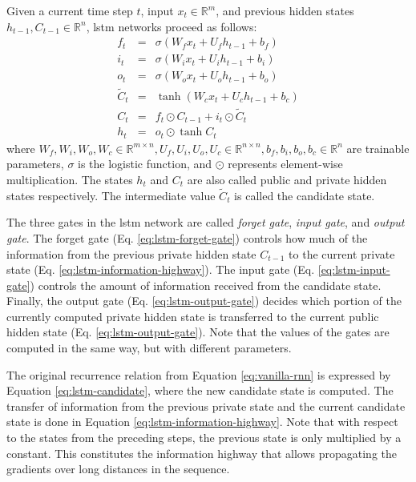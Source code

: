 Given a current time step $t$, input $x_t \in \mathbb{R}^m$, and previous hidden
states $h_{t-1}, C_{t-1} \in \mathbb{R}^n$, \gls{lstm} networks proceed as
follows:
%
\begin{eqnarray} f_t & = & \sigma\left(W_f x_t + U_f h_{t-1} + b_f\right)
\label{eq:lstm-forget-gate}\\ i_t & = & \sigma\left(W_i x_t + U_i h_{t-1} +
b_i\right)
\label{eq:lstm-input-gate}\\ o_t & = & \sigma\left(W_o x_t + U_o h_{t-1} +
b_o\right)
\label{eq:lstm-output-gate}\\ \tilde{C}_t & = & \tanh \left( W_c x_t + U_c
h_{t-1} + b_c \right)\label{eq:lstm-candidate} \\ C_t & = & f_t \odot C_{t-1} +
i_t \odot \tilde{C}_t
\label{eq:lstm-information-highway}\\ h_t & = & o_t \odot \tanh
C_t \label{eq:lstm-hidden-state}
\end{eqnarray}
%
where $W_f, W_i, W_o, W_c \in \mathbb{R}^{m \times n}, U_f, U_i, U_o, U_c \in
\mathbb{R}^{n \times n}, b_f, b_i, b_o, b_c \in \mathbb{R}^n$ are trainable
parameters, $\sigma$ is the logistic function, and $\odot$ represents
element-wise multiplication. The states $h_t$ and $C_t$ are also called public
and private hidden states respectively. The intermediate value $\tilde{C}_t$ is
called the candidate state.

The three gates in the \gls{lstm} network are called \emph{forget gate},
\emph{input gate}, and \emph{output gate}. The forget gate (Eq.
\ref{eq:lstm-forget-gate}) controls how much of the information from the
previous private hidden state $C_{t-1}$ to the current private state (Eq.
\ref{eq:lstm-information-highway}). The input gate (Eq.
\ref{eq:lstm-input-gate}) controls the amount of information received from the
candidate state. Finally, the output gate (Eq. \ref{eq:lstm-output-gate})
decides which portion of the currently computed private hidden state is
transferred to the current public hidden state
(Eq. \ref{eq:lstm-output-gate}). Note that the values of the gates are computed
in the same way, but with different parameters.

The original recurrence relation from Equation \ref{eq:vanilla-rnn} is expressed
by Equation \ref{eq:lstm-candidate}, where the new candidate state is
computed. The transfer of information from the previous private state and the
current candidate state is done in Equation
\ref{eq:lstm-information-highway}. Note that with respect to the states from the
preceding steps, the previous state is only multiplied by a constant. This
constitutes the information highway that allows propagating the gradients over
long distances in the sequence.




